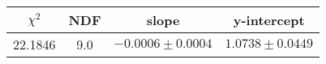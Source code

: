 \begin{tabular}{|c|c|c|c|}

\hline
$\chi^{2}$ & NDF & slope & y-intercept  \\
\hline
22.1846 & 9.0 & $-0.0006\pm0.0004$ & $1.0738\pm0.0449$ \\
\hline

\end{tabular}